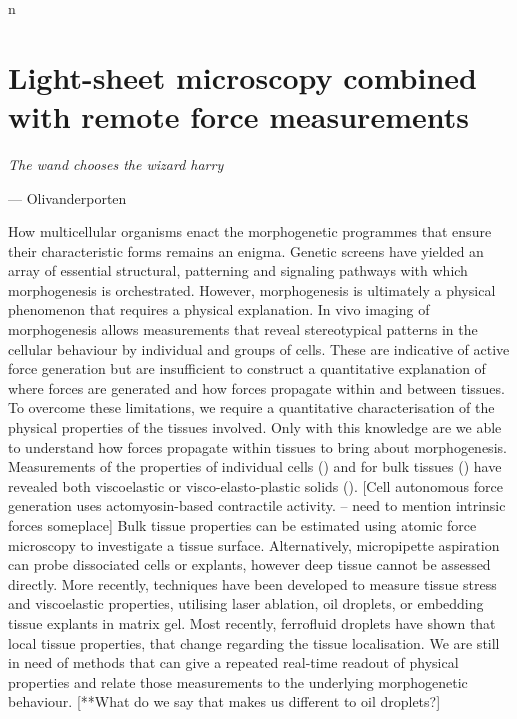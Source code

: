 \ifpdf
    \graphicspath{{Chapter/tweezers/Figs/Raster/}{Chapter/tweezers/Figs/PDF/}{Chapter/tweezers/Figs/}}
\else
    \graphicspath{{Chapter/tweezers/Figs/Vector/}{Chapter/tweezers/Figs/}}
\fi

 n

\chapter[Light-sheet microscopy combined with remote force measurements]{Light-sheet microscopy combined with remote force measurements}%
\epigraph{\textit{The wand chooses the wizard harry}}{--- Olivanderporten}
How multicellular organisms enact the morphogenetic programmes that ensure their characteristic forms remains an enigma.
Genetic screens have yielded an array of essential structural, patterning and signaling pathways with which morphogenesis is orchestrated.
However, morphogenesis is ultimately a physical phenomenon that requires a physical explanation.
In vivo imaging of morphogenesis allows measurements that reveal stereotypical patterns in the cellular behaviour by individual and groups of cells.
These are indicative of active force generation but are insufficient to construct a quantitative explanation of where forces are generated and how forces propagate within and between tissues.
To overcome these limitations, we require a quantitative characterisation of the physical properties of the tissues involved.
Only with this knowledge are we able to understand how forces propagate within tissues to bring about morphogenesis.
Measurements of the properties of individual cells () and for bulk tissues () have revealed both viscoelastic or visco-elasto-plastic solids ().
[Cell autonomous force generation uses actomyosin-based contractile activity. – need to mention intrinsic forces someplace]   Bulk tissue properties can be estimated using atomic force microscopy to investigate a tissue surface.
Alternatively, micropipette aspiration can probe dissociated cells or explants, however deep tissue cannot be assessed directly.
More recently, techniques have been developed to measure tissue stress and viscoelastic properties, utilising laser ablation,  oil droplets, or embedding tissue explants in matrix gel.
Most recently, ferrofluid droplets have shown that local tissue properties, that change regarding the tissue localisation.
We are still in need of methods that can give a repeated real-time readout of physical properties and relate those measurements to the underlying morphogenetic behaviour.
[**What do we say that makes us different to oil droplets?]

